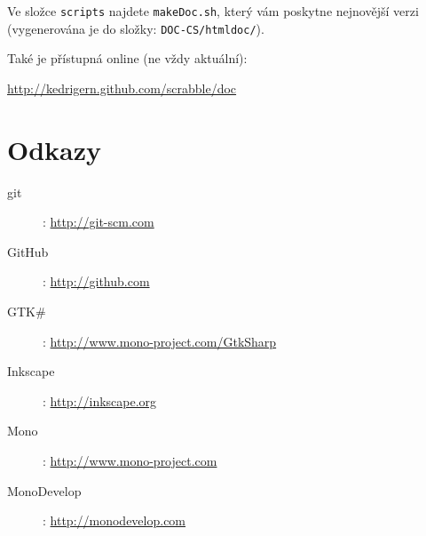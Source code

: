 \documentclass[a4paper]{article}
\begin{document}
Ve složce \texttt{scripts} najdete \texttt{makeDoc.sh}, který vám poskytne nejnovější verzi (vygenerována je do složky: \texttt{DOC-CS/htmldoc/}). 

Také je přístupná online (ne vždy aktuální):

\href{http://kedrigern.github.com/scrabble/doc}{http://kedrigern.github.com/scrabble/doc}

\section{Odkazy}
\begin{description}
\item[git]: \href{http://git-scm.com}{http://git-scm.com}
\item[GitHub]: \href{http://github.com}{http://github.com}
\item[GTK\#]: \href{http://www.mono-project.com/GtkSharp}{http://www.mono-project.com/GtkSharp}
\item[Inkscape]: \href{http://inkscape.org}{http://inkscape.org}
\item[Mono]: \href{http://www.mono-project.com}{http://www.mono-project.com}
\item[MonoDevelop]: \href{http://monodevelop.com}{http://monodevelop.com}
\end{description}
\end{document}
